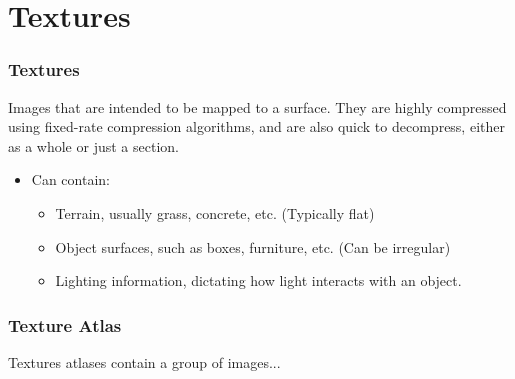 \documentclass{beamer}
\begin{document}
\section{Textures}
\begin{frame}
   \frametitle{Textures}
   Images that are intended to be mapped to a surface. They are highly compressed using fixed-rate compression algorithms, and are also quick to decompress, either as a whole or just a section.
   
   \begin{itemize}
   \item{Can contain:}
      \begin{itemize}
     \pause
      \item{Terrain, usually grass, concrete, etc. (Typically flat)}
      \item{Object surfaces, such as boxes, furniture, etc. (Can be irregular)}
      \item{Lighting information, dictating how light interacts with an object.}
      \end{itemize}
   \end{itemize}
\end{frame}

\begin{frame}
   \frametitle{Texture Atlas}
   Textures atlases contain a group of images...
   \pause
   \begin{figure}[!htbp]
   \begin{center}
   \end{center}
   \end{figure}
\end{frame}
\end{document}
